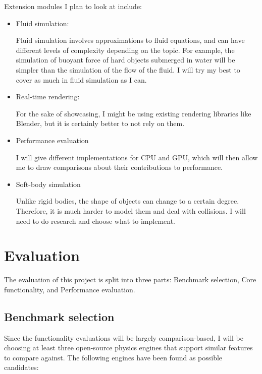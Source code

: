 \documentclass[12pt]{article}
\begin{document}
Extension modules I plan to look at include:
\begin{itemize}
\item Fluid simulation:

Fluid simulation involves approximations to fluid equations, 
and can have different levels of complexity depending on the topic.
For example, 
the simulation of buoyant force of hard objects submerged in water will be simpler than 
the simulation of the flow of the fluid.
I will try my best to cover as much in fluid simulation as I can.

\item Real-time rendering:

For the sake of showcasing, I might be using existing rendering libraries like Blender\cite{blender}, 
but it is certainly better to not rely on them.

\item Performance evaluation

I will give different implementations for CPU and GPU, 
which will then allow me to draw comparisons about their contributions to performance.

\item Soft-body simulation

Unlike rigid bodies, the shape of objects can change to a certain degree.
Therefore, it is much harder to model them and deal with collisions.
I will need to do research and choose what to implement. 

\end{itemize}

\section{Evaluation}

The evaluation of this project is split into three parts: Benchmark selection, Core functionality, and Performance evaluation.

\subsection{Benchmark selection}

Since the functionality evaluations will be largely comparison-based,
I will be choosing at least three open-source physics engines that support similar features to compare against.
The following engines have been found as possible candidates:
\end{document}
